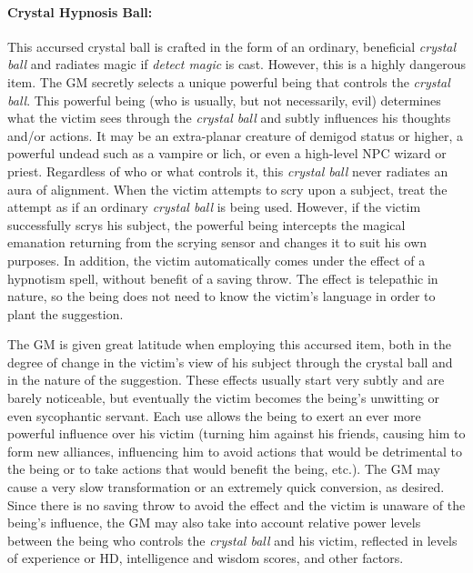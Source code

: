 \begin{multicols}{2}
\paragraph{Crystal Hypnosis Ball:} This accursed crystal ball is crafted in the form of an ordinary, beneficial \textit{crystal ball} and radiates magic if \textit{detect magic} is cast.  However, this is a highly dangerous item.  The GM secretly selects a unique powerful being that controls the \textit{crystal ball}.  This powerful being (who is usually, but not necessarily, evil) determines what the victim sees through the \textit{crystal ball} and subtly influences his thoughts and/or actions.  It may be an extra-planar creature of demigod status or higher, a powerful undead such as a vampire or lich, or even a high-level NPC wizard or priest.  Regardless of who or what controls it, this \textit{crystal ball} never radiates an aura of alignment.  When the victim attempts to scry upon a subject, treat the attempt as if an ordinary \textit{crystal ball} is being used.  However, if the victim successfully scrys his subject, the powerful being intercepts the magical emanation returning from the scrying sensor and changes it to suit his own purposes.  In addition, the victim automatically comes under the effect of a hypnotism spell, without benefit of a saving throw.  The effect is telepathic in nature, so the being does not need to know the victim's language in order to plant the suggestion.

The GM is given great latitude when employing this accursed item, both in the degree of change in the victim's view of his subject through the crystal ball and in the nature of the suggestion.  These effects usually start very subtly and are barely noticeable, but eventually the victim becomes the being's unwitting or even sycophantic servant.  Each use allows the being to exert an ever more powerful influence over his victim (turning him against his friends, causing him to form new alliances, influencing him to avoid actions that would be detrimental to the being or to take actions that would benefit the being, etc.).  The GM may cause a very slow transformation or an extremely quick conversion, as desired.  Since there is no saving throw to avoid the effect and the victim is unaware of the being's influence, the GM may also take into account relative power levels between the being who controls the \textit{crystal ball} and his victim, reflected in levels of experience or HD, intelligence and wisdom scores, and other factors.  


\end{multicols}
